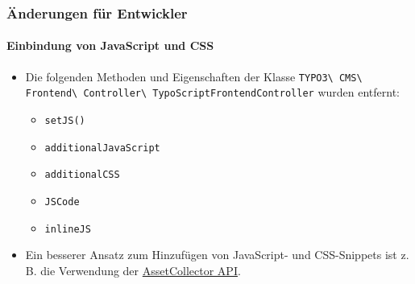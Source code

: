 %

\begin{frame}[fragile]
	\frametitle{Änderungen für Entwickler}
	\framesubtitle{Einbindung von JavaScript und CSS}


	\begin{itemize}
		\item Die folgenden Methoden und Eigenschaften der Klasse
			\smaller\texttt{TYPO3\textbackslash
				CMS\textbackslash
				Frontend\textbackslash
				Controller\textbackslash
				TypoScriptFrontendController}\normalsize\newline
			wurden entfernt:

			\begin{itemize}
				\item \texttt{setJS()}
				\item \texttt{additionalJavaScript}
				\item \texttt{additionalCSS}
				\item \texttt{JSCode}
				\item \texttt{inlineJS}
			\end{itemize}

		\item Ein besserer Ansatz zum Hinzufügen von JavaScript- und CSS-Snippets ist z. B. die Verwendung der
			\href{https://docs.typo3.org/m/typo3/reference-coreapi/master/en-us/ApiOverview/Assets/Index.html}{AssetCollector API}.
	\end{itemize}

\end{frame}

